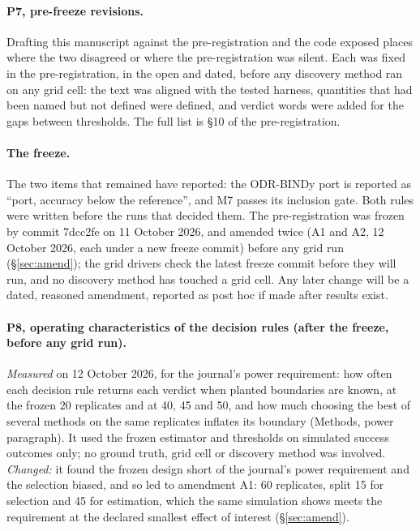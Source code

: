 \documentclass[11pt]{article}
\begin{document}
\paragraph{P7, pre-freeze revisions.}
Drafting this manuscript against the pre-registration and the code exposed places where
the two disagreed or where the pre-registration was silent. Each was fixed in the
pre-registration, in the open and dated, before any discovery method ran on any grid cell:
the text was aligned with the tested harness, quantities that had been named but not
defined were defined, and verdict words were added for the gaps between thresholds. The
full list is \S10 of the pre-registration.

\paragraph{The freeze.}
The two items that remained have reported: the ODR-BINDy port is reported as ``port,
accuracy below the reference'', and M7 passes its inclusion gate. Both rules were written
before the runs that decided them. The pre-registration was frozen by commit 7dcc2fe on
11 October 2026, and amended twice (A1 and A2, 12 October 2026, each under a new freeze
commit) before any grid run (\S\ref{sec:amend}); the grid drivers check the latest freeze commit before
they will run, and no discovery method has touched a grid cell. Any later change will be a dated, reasoned amendment,
reported as post hoc if made after results exist.

\paragraph{P8, operating characteristics of the decision rules (after the freeze, before any
grid run).}
\emph{Measured} on 12 October 2026, for the journal's power requirement: how often each
decision rule returns each verdict when planted boundaries are known, at the frozen 20
replicates and at 40, 45 and 50, and how much choosing the best of several methods on the
same replicates inflates its boundary (Methods, power paragraph). It used the frozen
estimator and thresholds on simulated success outcomes only; no ground truth, grid cell or
discovery method was involved.
\emph{Changed:} it found the frozen design short of the journal's power requirement and the
selection biased, and so led to amendment A1: 60 replicates, split 15 for selection and 45
for estimation, which the same simulation shows meets the requirement at the declared
smallest effect of interest (\S\ref{sec:amend}).
\end{document}
